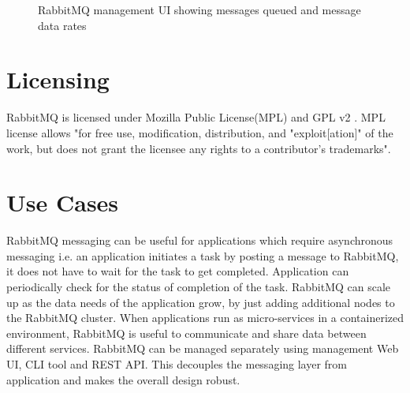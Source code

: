 \documentclass[9pt,twocolumn,twoside]{../../styles/osajnl}
\begin{document}
\begin{figure}[htbp]
\centering
{}
\caption{RabbitMQ management UI showing messages queued and message data rates\cite{www-rabbitmq-Johan}}
\label{fig:false-color}
\end{figure}

\section{Licensing}
RabbitMQ is licensed under Mozilla Public License(MPL) and GPL v2
\cite{www-rabbitmq-license}. MPL license \cite{www-mpl-license} allows "for free
use, modification, distribution, and "exploit[ation]" of the work, but does not
grant the licensee any rights to a contributor's trademarks".

\section{Use Cases}
RabbitMQ messaging can be useful for applications which require asynchronous
messaging i.e. an application initiates a task by posting a message to RabbitMQ,
it does not have to wait for the task to get completed. Application can
periodically check for the status of completion of the task. RabbitMQ can scale
up as the data needs of the application grow, by just adding additional nodes to
the RabbitMQ cluster. When applications run as micro-services in a containerized
environment, RabbitMQ is useful to communicate and share data between different
services. RabbitMQ can be managed separately using management Web UI, CLI tool
and REST API. This decouples the messaging layer from application and makes the
overall design robust. 
\end{document}
